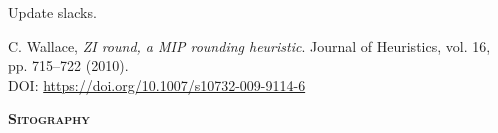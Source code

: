 \documentclass{book}
\begin{document}
\begin{algorithm}
	
	\caption{Update slacks.}
	\label{alg:updateslacks}
\end{algorithm}

\nocite{*}
\renewcommand{\bibname}{References}
\begin{thebibliography}{9}
	
	 C. Wallace, \textit{ZI round, a MIP rounding heuristic}. Journal of Heuristics, vol. 16, pp. 715–722 (2010). \\ DOI: \url{https://doi.org/10.1007/s10732-009-9114-6}
	
	\vspace{0.5cm}
	\textsc{\Large \textbf{Sitography}}
	
	
\end{thebibliography}
\end{document}
